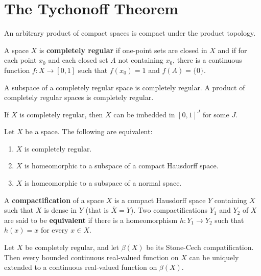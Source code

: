 \documentclass{article}
\begin{document}
\section{The Tychonoff Theorem}

  \begin{theorem}
  An arbitrary product of compact spaces is compact under the product topology. 
  \end{theorem}

  \begin{definition}
  A space $X$ is \textbf{completely regular} if one-point sets are closed in $X$ and if for each point $x_0$ and each closed set $A$ not containing $x_0$, there is a continuous function $f: X \longrightarrow [0,1]$ such that $f(x_0) = 1$ and $f(A) = \{0\}$. 
  \end{definition}

  \begin{theorem}
  A subspace of a completely regular space is completely regular. A product of completely regular spaces is completely regular. 
  \end{theorem}

  \begin{theorem}
  If $X$ is completely regular, then $X$ can be imbedded in $[0,1]^J$ for some $J$. 
  \end{theorem}

  \begin{corollary}
  Let $X$ be a space. The following are equivalent: 
  \begin{enumerate}
      \item $X$ is completely regular. 
      \item $X$ is homeomorphic to a subspace of a compact Hausdorff space. 
      \item $X$ is homeomorphic to a subspace of a normal space. 
  \end{enumerate}
  \end{corollary}

  \begin{definition}
  A \textbf{compactification} of a space $X$ is a compact Hausdorff space $Y$ containing $X$ such that $X$ is dense in $Y$ (that is $\bar{X} = Y$). Two compactifications $Y_1$ and $Y_2$ of $X$ are said to be \textbf{equivalent} if there is a homeomorphism $h: Y_1 \longrightarrow Y_2$ such that $h(x) = x$ for every $x \in X$. 
  \end{definition}

  \begin{theorem}
  Let $X$ be completely regular, and let $\beta(X)$ be its Stone-Cech compatification. Then every bounded continuous real-valued function on $X$ can be uniquely extended to a continuous real-valued function on $\beta(X)$. 
  \end{theorem}
\end{document}
